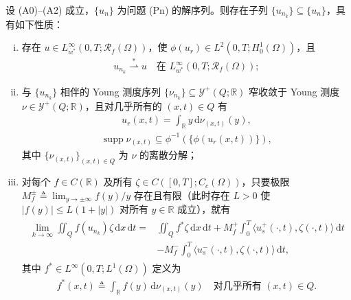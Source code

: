 \documentclass[../../main.tex]{subfiles}%
\begin{document}
\begin{theorem}\label{theorem:ch06-6.6.1}
设 (A0)--(A2) 成立，$\{u_n\}$ 为问题 (Pn) 的解序列。则存在子列 $\{u_{n_k}\}\subseteq\{u_n\}$，具有如下性质：
\begin{enumerate}[(i)]
\item 存在 $u\in L^\infty_{w^*}(0,T;\mathscr{R}_f(\Omega))$，使 $\phi(u_r)\in L^2(0,T;H^1_0(\Omega))$，且
\begin{align}
u_{n_k}\stackrel{*}{\rightharpoonup}u \quad\text{在 }L^\infty_{w^*}(0,T;\mathscr{R}_f(\Omega)); \label{align:ch6-6.77}
\end{align}
\item 与 $\{u_{n_k}\}$ 相伴的 Young 测度序列 $\{\nu_{n_k}\}\subseteq\mathcal{Y}^+(Q;\mathbb{R})$ 窄收敛于 Young 测度 $\nu\in\mathcal{Y}^+(Q;\mathbb{R})$，且对几乎所有的 $(x,t)\in Q$ 有
\begin{align}
u_r(x,t)=\int_\mathbb{R}y\,\mathrm{d}\nu_{(x,t)}(y), \label{align:ch6-6.78}
\end{align}
\begin{align}
\operatorname{supp}\nu_{(x,t)}\subseteq\phi^{-1}(\{\phi(u_r(x,t))\}), \label{align:ch6-6.79}
\end{align}
其中 $\{\nu_{(x,t)}\}_{(x,t)\in Q}$ 为 $\nu$ 的离散分解；
\item 对每个 $f\in C(\mathbb{R})$ 及所有 $\zeta\in C([0,T];C_c(\Omega))$，只要极限 $M^\pm_f\triangleq\lim_{y\to\pm\infty}f(y)/y$ 存在且有限（此时存在 $L>0$ 使 $|f(y)|\leqslant L(1+|y|)$ 对所有 $y\in\mathbb{R}$ 成立），就有
\begin{align}
\begin{aligned}
\lim_{k\to\infty}\iint_Q f(u_{n_k})\zeta\,\mathrm{d}x\,\mathrm{d}t
={}&\iint_Q f^*\zeta\,\mathrm{d}x\,\mathrm{d}t
+M^+_f\int_0^T\langle u^+_s(\cdot,t),\zeta(\cdot,t)\rangle\,\mathrm{d}t\\
&-M^-_f\int_0^T\langle u^-_s(\cdot,t),\zeta(\cdot,t)\rangle\,\mathrm{d}t,
\end{aligned} 
\label{align:ch6-6.80}
\end{align}
其中 $f^*\in L^\infty(0,T;L^1(\Omega))$ 定义为
\begin{align}
f^*(x,t)\triangleq \int_\mathbb{R}f(y)\,\mathrm{d}\nu_{(x,t)}(y)
\quad\text{对几乎所有 }(x,t)\in Q. \label{align:ch6-6.81}
\end{align}
\end{enumerate}
\end{theorem}
\end{document}
